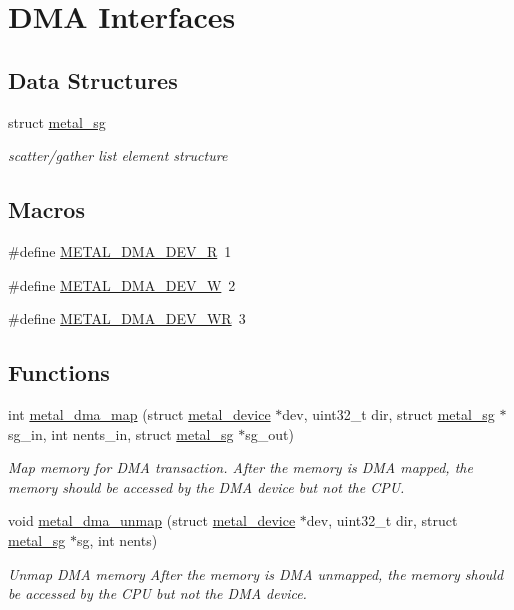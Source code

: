 \hypertarget{group__dma}{}\section{D\+MA Interfaces}
\label{group__dma}
\subsection*{Data Structures}
\begin{DoxyCompactItemize}
\item 
struct \hyperlink{structmetal__sg}{metal\+\_\+sg}
\begin{DoxyCompactList}\small\item\em scatter/gather list element structure \end{DoxyCompactList}\end{DoxyCompactItemize}
\subsection*{Macros}
\begin{DoxyCompactItemize}
\item 
\#define \hyperlink{group__dma_ga2fb237c063134da0e06cbd00121f73fd}{M\+E\+T\+A\+L\+\_\+\+D\+M\+A\+\_\+\+D\+E\+V\+\_\+R}~1
\item 
\#define \hyperlink{group__dma_ga3bc89e88d23b9c8d8abc29a67d4de5f5}{M\+E\+T\+A\+L\+\_\+\+D\+M\+A\+\_\+\+D\+E\+V\+\_\+W}~2
\item 
\#define \hyperlink{group__dma_ga46cf17be6807859aa1bba927caa6511a}{M\+E\+T\+A\+L\+\_\+\+D\+M\+A\+\_\+\+D\+E\+V\+\_\+\+WR}~3
\end{DoxyCompactItemize}
\subsection*{Functions}
\begin{DoxyCompactItemize}
\item 
int \hyperlink{group__dma_gacf0433b5f000a96313a25cab6a858f2e}{metal\+\_\+dma\+\_\+map} (struct \hyperlink{structmetal__device}{metal\+\_\+device} $\ast$dev, uint32\+\_\+t dir, struct \hyperlink{structmetal__sg}{metal\+\_\+sg} $\ast$sg\+\_\+in, int nents\+\_\+in, struct \hyperlink{structmetal__sg}{metal\+\_\+sg} $\ast$sg\+\_\+out)
\begin{DoxyCompactList}\small\item\em Map memory for D\+MA transaction. After the memory is D\+MA mapped, the memory should be accessed by the D\+MA device but not the C\+PU. \end{DoxyCompactList}\item 
void \hyperlink{group__dma_gacd34bcf93bfb78a4ffbab2aaa68b443d}{metal\+\_\+dma\+\_\+unmap} (struct \hyperlink{structmetal__device}{metal\+\_\+device} $\ast$dev, uint32\+\_\+t dir, struct \hyperlink{structmetal__sg}{metal\+\_\+sg} $\ast$sg, int nents)
\begin{DoxyCompactList}\small\item\em Unmap D\+MA memory After the memory is D\+MA unmapped, the memory should be accessed by the C\+PU but not the D\+MA device. \end{DoxyCompactList}\end{DoxyCompactItemize}


